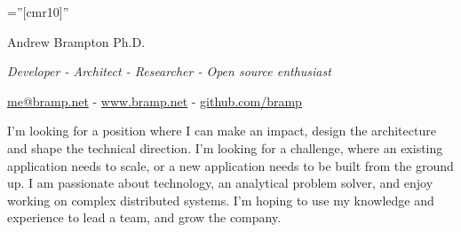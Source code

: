 \documentclass[letterpaper,10pt]{article}
\newcounter{dateone}
\newcounter{datetwo}
\newcommand{\difftoday}[3]{%
      \setmydatenumber{dateone}{\the\year}{\the\month}{\the\day}%
      \setmydatenumber{datetwo}{#1}{#2}{#3}%
      \addtocounter{datetwo}{-\thedateone}%
      \the\numexpr-\thedatetwo/365\relax\space years
}
\begin{document}
\pagestyle{empty} %

\font\fb=''[cmr10]'' %

\par{\centering
	{\Huge Andrew Brampton Ph.D.}

	{\it Developer - Architect - Researcher - Open source enthusiast}

	\href{mailto:me@bramp.net}{me@bramp.net} - \href{http://bramp.net}{www.bramp.net} - \href{https://github.com/bramp}{github.com/bramp}
\par}

I'm looking for a position where I can make an impact, design the architecture and shape the technical direction. I'm looking for a challenge, where an existing
application needs to scale, or a new application needs to be built from the ground up. I am passionate about technology, an analytical problem solver, and enjoy
working on complex distributed systems. I'm hoping to use my knowledge and experience to lead a team, and grow the company.


\end{document}
